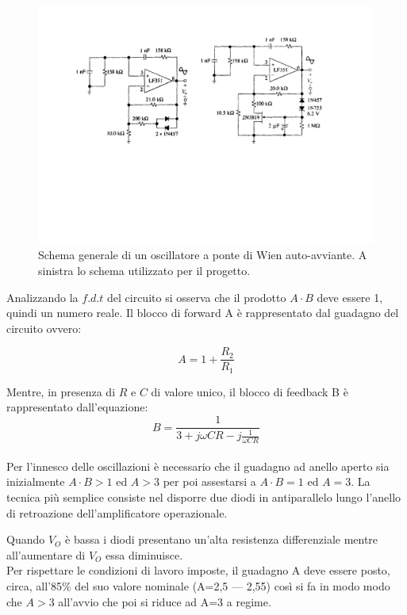 \documentclass[titlepage]{report}
\begin{document}
	\begin{figure}[h]
		\centering
		\includegraphics[scale=0.7]{Immagini/Ponte di wien giusto.pdf}
		\caption{Schema generale di un oscillatore a ponte di Wien auto-avviante. A sinistra lo schema utilizzato per il progetto.}
		\label{fig:sch_osc_wien}
	\end{figure}

	\noindent Analizzando la $f.d.t$ del circuito si osserva che il prodotto $A\cdot B$ deve essere 1, quindi un numero reale.
	Il blocco di forward A è rappresentato dal guadagno del circuito ovvero: 

	\begin{equation}
		\label{eq:LF356_Gain}
		A = 1 + \frac{R_2}{R_1}
	\end{equation}


	Mentre, in presenza di $R$ e $C$ di valore unico, il blocco di feedback B è rappresentato dall'equazione:
	\\
	\begin{equation}
		\label{eq:LF356_Feedback}
		B = \frac{1}{3 + j\omega C R - j\frac{1}{\omega C R}}
	\end{equation}
	\\
	Per l'innesco delle oscillazioni è necessario che il guadagno ad anello aperto sia inizialmente $A\cdot B>1$ ed $A>3$ per poi assestarsi a $A\cdot B=1$ ed $A=3$. La tecnica più semplice consiste nel disporre due diodi in antiparallelo lungo l'anello di retroazione dell'amplificatore operazionale.
	
	\noindent Quando \textit{$V_{O}$} è bassa i diodi presentano un'alta resistenza differenziale mentre all'aumentare di \textit{$V_{O}$} essa diminuisce. 
	\\ Per rispettare le condizioni di lavoro imposte, il guadagno A deve essere posto, circa, all'85\% del suo valore nominale (A=2,5 — 2,55) così si fa in modo modo che $A>3$ all'avvio che poi si riduce ad A=3 a regime.
\end{document}
